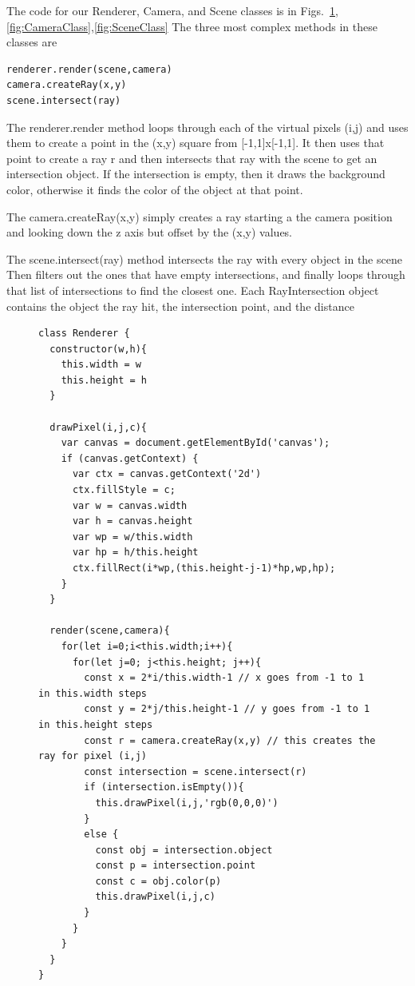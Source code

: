 \documentclass{book}
\begin{document}
The code for our Renderer, Camera, and Scene classes is in Figs.~\ref{fig:RendererClass},\ref{fig:CameraClass},\ref{fig:SceneClass} 
The three most complex methods in these classes are
\begin{verbatim}
renderer.render(scene,camera)
camera.createRay(x,y)
scene.intersect(ray)
\end{verbatim}
The renderer.render method loops through each of the virtual pixels (i,j) and uses them to
create a point in the (x,y) square from [-1,1]x[-1,1]. It then uses that point to create a ray r
and then intersects that ray with the scene to get an intersection object.
If the intersection is empty, then it draws the background color, otherwise it finds the color of the object at that point.

The camera.createRay(x,y) simply creates a ray starting a the camera position and looking down the z axis but offset by the (x,y) values.

The scene.intersect(ray) method intersects the ray with every object in the scene
Then filters out the ones that have empty intersections, and finally loops through that list of intersections to find the closest one.  Each RayIntersection object contains the object the ray hit, the intersection point, and the distance
\begin{figure}
\begin{verbatim}
class Renderer {
  constructor(w,h){
    this.width = w
    this.height = h
  }

  drawPixel(i,j,c){
    var canvas = document.getElementById('canvas');
    if (canvas.getContext) {
      var ctx = canvas.getContext('2d')
      ctx.fillStyle = c;
      var w = canvas.width
      var h = canvas.height
      var wp = w/this.width
      var hp = h/this.height
      ctx.fillRect(i*wp,(this.height-j-1)*hp,wp,hp);
    }
  }

  render(scene,camera){
    for(let i=0;i<this.width;i++){
      for(let j=0; j<this.height; j++){
        const x = 2*i/this.width-1 // x goes from -1 to 1 in this.width steps
        const y = 2*j/this.height-1 // y goes from -1 to 1 in this.height steps
        const r = camera.createRay(x,y) // this creates the ray for pixel (i,j)
        const intersection = scene.intersect(r)
        if (intersection.isEmpty()){
          this.drawPixel(i,j,'rgb(0,0,0)')
        }
        else {
          const obj = intersection.object
          const p = intersection.point
          const c = obj.color(p)
          this.drawPixel(i,j,c)
        }
      }
    }
  }
}
\end{verbatim}
\caption{\label{fig:RendererClass}}
\end{figure}
\end{document}
